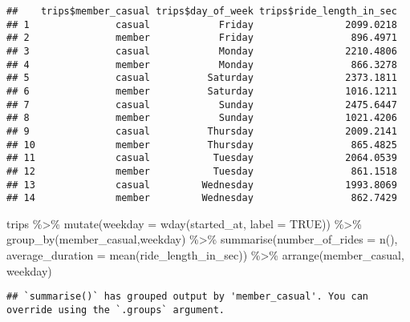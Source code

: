 \documentclass[
]{article}
\newenvironment{Shaded}{\begin{snugshade}}{\end{snugshade}}
\newcommand{\AttributeTok}[1]{\textcolor[rgb]{0.77,0.63,0.00}{#1}}
\newcommand{\ConstantTok}[1]{\textcolor[rgb]{0.00,0.00,0.00}{#1}}
\newcommand{\FunctionTok}[1]{\textcolor[rgb]{0.00,0.00,0.00}{#1}}
\newcommand{\NormalTok}[1]{#1}
\newcommand{\SpecialCharTok}[1]{\textcolor[rgb]{0.00,0.00,0.00}{#1}}
\begin{document}
\begin{verbatim}
##    trips$member_casual trips$day_of_week trips$ride_length_in_sec
## 1               casual            Friday                2099.0218
## 2               member            Friday                 896.4971
## 3               casual            Monday                2210.4806
## 4               member            Monday                 866.3278
## 5               casual          Saturday                2373.1811
## 6               member          Saturday                1016.1211
## 7               casual            Sunday                2475.6447
## 8               member            Sunday                1021.4206
## 9               casual          Thursday                2009.2141
## 10              member          Thursday                 865.4825
## 11              casual           Tuesday                2064.0539
## 12              member           Tuesday                 861.1518
## 13              casual         Wednesday                1993.8069
## 14              member         Wednesday                 862.7429
\end{verbatim}

\begin{Shaded}
\begin{Highlighting}[]
\NormalTok{trips }\SpecialCharTok{\%\textgreater{}\%}
  \FunctionTok{mutate}\NormalTok{(}\AttributeTok{weekday =} \FunctionTok{wday}\NormalTok{(started\_at, }\AttributeTok{label =} \ConstantTok{TRUE}\NormalTok{)) }\SpecialCharTok{\%\textgreater{}\%}
  \FunctionTok{group\_by}\NormalTok{(member\_casual,weekday) }\SpecialCharTok{\%\textgreater{}\%}
  \FunctionTok{summarise}\NormalTok{(}\AttributeTok{number\_of\_rides =} \FunctionTok{n}\NormalTok{(), }\AttributeTok{average\_duration =} \FunctionTok{mean}\NormalTok{(ride\_length\_in\_sec)) }\SpecialCharTok{\%\textgreater{}\%}
  \FunctionTok{arrange}\NormalTok{(member\_casual, weekday)}
\end{Highlighting}
\end{Shaded}

\begin{verbatim}
## `summarise()` has grouped output by 'member_casual'. You can override using the `.groups` argument.
\end{verbatim}
\end{document}
